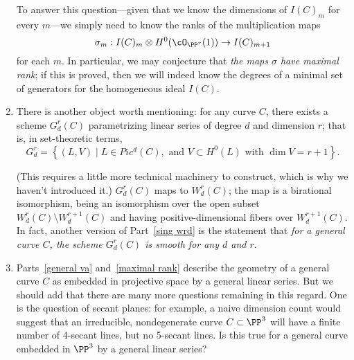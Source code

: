 \begin{enumerate}
To answer this question---given that we know the dimensions of $I(C)_m$ for every $m$---we simply need to know the ranks of the multiplication maps
$$
\sigma_m : I(C)_m \otimes H^0(\cO_{\PP^r}(1)) \to I(C)_{m+1}
$$
for each $m$. In particular, we may conjecture that \emph{the maps $\sigma$ have maximal rank}; if this is proved, then we will indeed know the degrees of a minimal set of generators for the homogeneous ideal $I(C)$.

\item There is another object worth mentioning: for any curve $C$, there exists a scheme $G^r_d(C)$ parametrizing linear series of degree $d$ and dimension $r$; that is, in set-theoretic terms,
$$
G^r_d = \left\{ (L, V) \mid L \in Pic^d(C), \text{ and } V \subset H^0(L) \text{ with } \dim V = r+1 \right\}.
$$

(This requires a little more technical machinery to construct, which is why we haven't introduced it.) $G^r_d(C)$ maps to $W^r_d(C)$; the map is a birational isomorphism, being an isomorphism over the open subset $W^r_d(C) \setminus W^{r+1}_d(C)$ and having positive-dimensional fibers over $W^{r+1}_d(C)$. In fact, another version of Part~\ref{sing wrd} is the statement that \emph{for a general curve $C$, the scheme $G^r_d(C)$ is smooth for any $d$ and $r$}.

\item Parts~\ref{general va} and~\ref{maximal rank} describe the geometry of a general curve $C$ as embedded in projective space by a general linear series. But we should add that there are many more questions remaining in this regard. One is the question of secant planes: for example, a naive dimension count would suggest that an irreducible, nondegenerate curve $C \subset \PP^3$ will have a finite number of 4-secant lines, but no 5-secant lines. Is this true for a general curve embedded in $\PP^3$ by a general linear series?
\end{enumerate}

